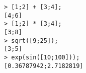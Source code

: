 \begin{center}\begin{minipage}{15cm}\begin{Verbatim}[frame=single]
> [1;2] + [3;4];
[4;6]
> [1;2] * [3;4];
[3;8]
> sqrt([9;25]);
[3;5]
> exp(sin([10;100]));
[0.36787942;2.7182819]
\end{Verbatim}
\end{minipage}\end{center}
